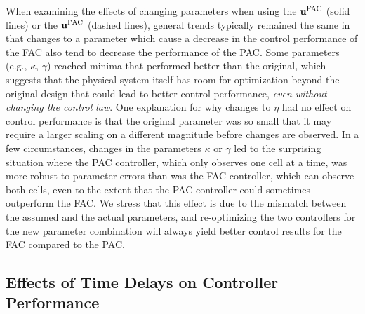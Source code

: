 \documentclass[12pt]{article}
\begin{document}
When examining the effects of changing parameters when using the $\mathbf{u}^{\rm FAC}$ (solid lines) or the $\mathbf{u}^{\rm PAC}$ (dashed lines), general trends typically remained the same in that changes to a parameter which cause a decrease in the control performance of the FAC also tend to decrease the performance of the PAC. Some parameters (e.g., $\kappa$, $\gamma$) reached minima that performed better than the original, which suggests that the physical system itself has room for optimization beyond the original design that could lead to better control performance, {\em even without changing the control law}.  One explanation for why changes to $\eta$ had no effect on control performance is that the original parameter was so small that it may require a larger scaling on a different magnitude before changes are observed. 
In a few circumstances, changes in the parameters $\kappa$ or $\gamma$ led to the surprising situation where the PAC controller, which only observes one cell at a time, was more robust to parameter errors than was the FAC controller, which can observe both cells, even to the extent that the PAC controller could sometimes outperform the FAC.  We stress that this effect is due to the mismatch between the assumed and the actual parameters, and re-optimizing the two controllers for the new parameter combination will always yield better control results for the FAC compared to the PAC.

\subsection{Effects of Time Delays on Controller Performance}
\end{document}
